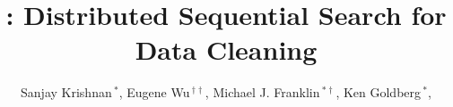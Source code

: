 \documentclass{sig-alternate}
\begin{document}
\newcommand{\reminder}[1]{{{\textcolor{magenta}{\{\{\bf #1\}\}}}\xspace}}
\newcommand{\ewu}[1]{{{\textcolor{blue}{\{\{\bf ewu:\} #1\}}}\xspace}}
\newcommand{\mps}[1]{{{\textcolor{red}{\{\{\bf meelap:\} #1\}}}\xspace}}
\newcommand{\stitle}[1]{\vspace{0.5em}\noindent\textbf{#1}}



\newcommand{\blue}[1]{{\textcolor{blue}{{\bf #1}}\xspace}}
\newcommand{\orange}[1]{{\textcolor{orange}{{\bf #1}}\xspace}}
\newcommand{\pop}[1]{{\textcolor{pop}{{\textit{\textbf{#1}}}}\xspace}}



\newcommand{\specialcell}[2][c]{%
  \begin{tabular}[#1]{@{}c@{}}#2\end{tabular}}

\def\ojoin{\setbox0=\hbox{$\bowtie$}%
  \rule[-.02ex]{.25em}{.4pt}\llap{\rule[\ht0]{.25em}{.4pt}}}
\def\leftouterjoin{\mathbin{\ojoin\mkern-5.8mu\bowtie}}
\def\rightouterjoin{\mathbin{\bowtie\mkern-5.8mu\ojoin}}
\def\fullouterjoin{\mathbin{\ojoin\mkern-5.8mu\bowtie\mkern-5.8mu\ojoin}}


\pagestyle{plain}

%

\title{\sys: Distributed Sequential Search for Data Cleaning}


\author{ Sanjay Krishnan$\,^{*}$, Eugene Wu{$\,^{\dag\dag}$}, Michael J. Franklin$\,^{*\dag}$, Ken Goldberg$\,^{*}$,  \\
 \\
\\
\affaddr{}
}



\maketitle
\end{document}
